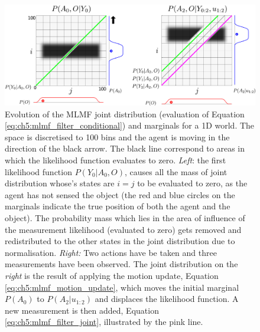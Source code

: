 \begin{figure}
 \centering
 \includegraphics[width=\textwidth]{./ch5-MLMF/Figures/Figure6_v2.pdf}
 \caption{Evolution of the MLMF joint distribution (evaluation of Equation \ref{eq:ch5:mlmf_filter_conditional}) and marginals for a 1D world. The space is discretised to 100 bins and the agent is moving in the direction of the black arrow. 
 The black line correspond to areas in which the likelihood function evaluates to zero.  \textit{Left}: the first 
 likelihood function $P(Y_0|A_0,O)$, causes all the mass of joint distribution whose's states are $i=j$ to be evaluated to zero, as
 the agent has not sensed the object (the red and blue circles on the marginals indicate the true position of
 both the agent and the object). The probability mass which lies in the area of influence of the measurement likelihood (evaluated to zero) gets 
 removed and redistributed to the other states in the joint distribution due to normalisation.
 \textit{Right:} Two actions have be taken and three measurements have been observed. The joint distribution on the \textit{right} is the result of 
 applying the motion update, Equation \ref{eq:ch5:mlmf_motion_update}, which moves the initial marginal $P(A_0)$ to $P(A_2|u_{1:2})$ and displaces the 
 likelihood function. A new measurement is then added, Equation \ref{eq:ch5:mlmf_filter_joint}, illustrated by the pink line.}
 \label{fig:margina_joint_example}
\end{figure}



